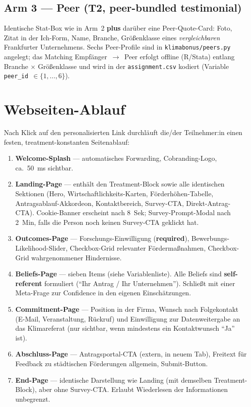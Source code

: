 \documentclass[11pt, a4paper]{scrartcl}
\newcommand{\var}[1]{\texttt{\small #1}}
\begin{document}
\subsection*{Arm 3 --- Peer (T2, peer-bundled testimonial)}
Identische Stat-Box wie in Arm~2 \textbf{plus} darüber eine Peer-Quote-Card:
Foto, Zitat in der Ich-Form, Name, Branche, Größenklasse eines
\emph{vergleichbaren} Frankfurter Unternehmens. Sechs Peer-Profile sind in
\var{klimabonus/peers.py} angelegt; das Matching Empfänger~$\rightarrow$~Peer
erfolgt offline (R/Stata) entlang Branche $\times$ Größenklasse und wird
in der \var{assignment.csv} kodiert (Variable \var{peer\_id}~$\in \{1,\ldots,6\}$).



\section{Webseiten-Ablauf}

Nach Klick auf den personalisierten Link durchläuft die/der
Teilnehmer:in einen festen, treatment-konstanten Seitenablauf:

\begin{enumerate}[label=\textbf{\arabic*.}]
    \item \textbf{Welcome-Splash} --- automatisches Forwarding,
        Cobranding-Logo, ca.~50~ms sichtbar.
    \item \textbf{Landing-Page} --- enthält den Treatment-Block sowie alle
        identischen Sektionen (Hero, Wirtschaftlichkeits-Karten,
        Förderhöhen-Tabelle, Antragsablauf-Akkordeon, Kontaktbereich,
        Survey-CTA, Direkt-Antrag-CTA). Cookie-Banner erscheint nach 8~Sek;
        Survey-Prompt-Modal nach 2~Min, falls die Person noch keinen
        Survey-CTA geklickt hat.
    \item \textbf{Outcomes-Page} --- Forschungs-Einwilligung (\textbf{required}),
        Bewerbungs-Likelihood-Slider, Checkbox-Grid relevanter
        Fördermaßnahmen, Checkbox-Grid wahrgenommener Hindernisse.
    \item \textbf{Beliefs-Page} --- sieben Items (siehe Variablenliste).
        Alle Beliefs sind \textbf{self-referent} formuliert (\enquote{Ihr
        Antrag / Ihr Unternehmen}). Schließt mit einer Meta-Frage zur
        Confidence in den eigenen Einschätzungen.
    \item \textbf{Commitment-Page} --- Position in der Firma, Wunsch nach
        Folgekontakt (E-Mail, Veranstaltung, Rückruf) und Einwilligung zur
        Datenweitergabe an das Klimareferat (nur sichtbar, wenn
        mindestens ein Kontaktwunsch \enquote{Ja} ist).
    \item \textbf{Abschluss-Page} --- Antragsportal-CTA (extern, in neuem
        Tab), Freitext für Feedback zu städtischen Förderungen allgemein,
        Submit-Button.
    \item \textbf{End-Page} --- identische Darstellung wie Landing
        (mit demselben Treatment-Block), aber ohne Survey-CTA. Erlaubt
        Wiederlesen der Informationen unbegrenzt.
\end{enumerate}
\end{document}
